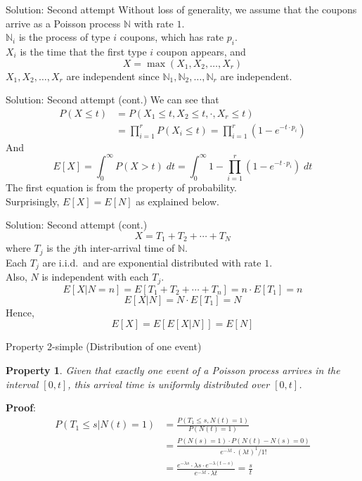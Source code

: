 \documentclass[mathserif]{beamer}
\newtheorem{pty}{Property}
\begin{document}
\begin{frame}{Solution: Second attempt}
Without loss of generality, we assume that the coupons arrive as a Poisson process $\mathbb{N}$ with rate $1$.\\
$\mathbb{N}_i$ is the process of type $i$ coupons, which has rate $p_i$.\\
$X_i$ is the time that the first type $i$ coupon appears, and
\[
X = \max(X_1, X_2, \ldots, X_r)
\]
$X_1, X_2, \ldots, X_r$ are independent since $\mathbb{N}_1, \mathbb{N}_2, \ldots, \mathbb{N}_r$ are independent.
\end{frame}

\begin{frame}{Solution: Second attempt (cont.)}
We can see that
\begin{align*}
P(X\leq t) & = P(X_1\leq t, X_2\leq t, \cdot, X_r\leq t) \\
& = \prod_{i=1}^r P(X_i\leq t) = \prod_{i=1}^r (1 - e^{-t\cdot p_i})
\end{align*}
And
\[
E[X] = \int_0^\infty P(X > t)\; dt = \int_0^\infty 1 - \prod_{i=1}^r (1 - e^{-t\cdot p_i})\; dt
\]
The first equation is from the property of probability.\\
Surprisingly, $E[X] = E[N]$ as explained below.
\end{frame}

\begin{frame}{Solution: Second attempt (cont.)}
\[
X = T_1 + T_2 + \cdots + T_N
\]
where $T_j$ is the $j$th inter-arrival time of $\mathbb{N}$.\\
Each $T_j$ are i.i.d.\ and are exponential distributed with rate $1$.\\
Also, $N$ is independent with each $T_j$.
\[
E[X|N=n] = E[T_1 + T_2 + \cdots + T_n] = n\cdot E[T_1] = n
\]
\[
E[X|N] = N\cdot E[T_1] = N
\]
Hence,
\[
E[X] = E[E[X|N]] = E[N]
\]
\end{frame}

\begin{frame}{Property 2-simple (Distribution of one event)}
\begin{pty}
Given that exactly one event of a Poisson process arrives in the interval $[0,t]$,
this arrival time is uniformly distributed over $[0,t]$.
\end{pty}
\textbf{Proof}:
\begin{align*}
P(T_1\leq s | N(t)=1) & = \frac{P(T_1\leq s, N(t)=1)}{P(N(t)=1)} \\
& = \frac{P(N(s)=1)\cdot P(N(t)-N(s)=0)}{e^{-\lambda t}\cdot (\lambda t)^1 / 1!}\\
& = \frac{e^{-\lambda s}\cdot \lambda s \cdot e^{-\lambda(t-s)}}{e^{-\lambda t}\cdot \lambda t}
= \frac{s}{t}
\end{align*}
\end{frame}
\end{document}
